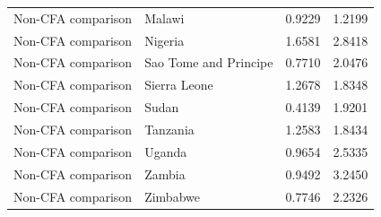 \begin{table}
\begin{tabular}[t]{llrr}
Non-CFA comparison & Malawi & 0.9229 & 1.2199\\
Non-CFA comparison & Nigeria & 1.6581 & 2.8418\\
Non-CFA comparison & Sao Tome and Principe & 0.7710 & 2.0476\\
Non-CFA comparison & Sierra Leone & 1.2678 & 1.8348\\
\addlinespace
Non-CFA comparison & Sudan & 0.4139 & 1.9201\\
Non-CFA comparison & Tanzania & 1.2583 & 1.8434\\
Non-CFA comparison & Uganda & 0.9654 & 2.5335\\
Non-CFA comparison & Zambia & 0.9492 & 3.2450\\
Non-CFA comparison & Zimbabwe & 0.7746 & 2.2326\\
\bottomrule
\end{tabular}
\end{table}
